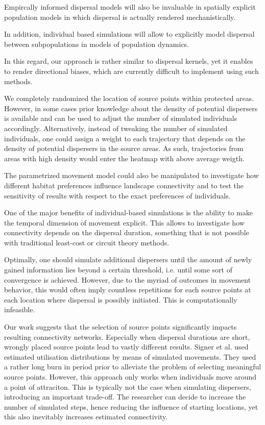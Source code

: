 \documentclass[abstract=on,10pt,a4paper,bibliography=totocnumbered]{article}
\begin{document}
Empircally informed dispersal models will also be invaluable in spatially
explicit population models in which dispersal is actually rendered
mechanistically.

In addition, individual based simulations will allow to explicitly model
dispersal between subpopulations in models of population dynamics.

In this regard, our approach is rather similar to dispersal kernels, yet it
enables to render directional biases, which are currently difficult to implement
using such methods.

We completely randomized the location of source points within protected areas.
However, in some cases prior knowledge about the density of potential dispersers
is available and can be used to adjust the number of simulated individuals
accordingly. Alternatively, instead of tweaking the number of simulated
individuals, one could assign a weight to each trajectory that depends on the
density of potential dispersers in the source areas. As such, trajectories from
areas with high density would enter the heatmap with above average weigth.

The parametrized movement model could also be manipulated to investigate how
different habitat preferences influence landscape connectivity and to test the
sensitivity of results with respect to the exact preferences of individuals.

One of the major benefits of individual-based simulations is the ability to make
the temporal dimension of movement explicit. This allows to investigate how
connectivity depends on the dispersal duration, something that is not possible
with traditional least-cost or circuit theory methods.

Optimally, one should simulate additional dispersers until the amount of newly
gained information lies beyond a certain threshold, i.e. until some sort of
convergence is achieved. However, due to the myriad of outcomes in movement
behavior, this would often imply countless repetitions for each source points at
each location where dispersal is possibly initiated. This is computationally
infeasible.

Our work suggests that the selection of source points significantly impacts
resulting connectivity networks. Especially when dispersal durations are short,
wrongly placed source points lead to vastly different results. Signer et al.
used estimated utilisation distributions by means of simulated movements. They
used a rather long burn in period prior to alleviate the problem of selecting
meaningful source points. However, this approach only works when individuals
move around a point of attraciton. This is typically not the case when
simulating dispersers, introducing an important trade-off. The researcher can
decide to increase the number of simulated steps, hence reducing the influence
of starting locations, yet this also inevitably increases estimated
connectivity.
\end{document}
